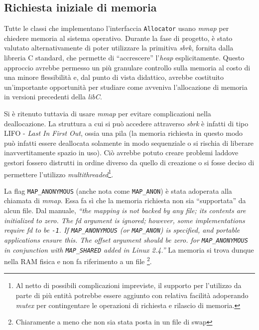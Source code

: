 \subsection{Richiesta iniziale di memoria}
Tutte le classi che implementano l’interfaccia \texttt{Allocator} usano \textit{mmap} per chiedere memoria al sistema operativo. Durante la fase di progetto, è stato valutato alternativamente di poter utilizzare la primitiva \textit{sbrk}, fornita dalla libreria C standard, che permette di “accrescere” l’\textit{heap} esplicitamente. Questo approccio avrebbe permesso un più granulare controllo sulla memoria al costo di una minore flessibilità e, dal punto di vista didattico, avrebbe costituito un'importante opportunità per studiare come avveniva l’allocazione di memoria in versioni precedenti della \textit{libC}.

Si è ritenuto tuttavia di usare \textit{mmap} per evitare complicazioni nella deallocazione. La struttura a cui si può accedere attraverso \textit{sbrk} è infatti di tipo LIFO - \textit{Last In First Out}, ossia una pila (la memoria richiesta in questo modo può infatti essere deallocata solamente in modo sequenziale o si rischia di liberare inavvertitamente spazio in uso). Ciò avrebbe potuto creare problemi laddove gestori fossero distrutti in ordine diverso da quello di creazione o si fosse deciso di permettere l’utilizzo \textit{multithreaded}\footnote{Al netto di possibili complicazioni impreviste, il supporto per l'utilizzo da parte di più entità potrebbe essere aggiunto con relativa facilità adoperando \textit{mutex} per contingentare le operazioni di richiesta e rilascio di memoria.}.

La flag \texttt{MAP\_ANONYMOUS} (anche nota come \texttt{MAP\_ANON}) è stata adoperata alla chiamata di \textit{mmap}. Essa fa sì che la memoria richiesta non sia “supportata” da alcun file. Dal manuale, \textit{“the mapping is not backed by any file; its contents are initialized to zero. The fd argument is ignored; however, some implementations require fd to be \texttt{-1}. If \texttt{MAP\_ANONYMOUS} (or \texttt{MAP\_ANON}) is specified, and portable applications ensure this. The offset argument should be zero. for \texttt{MAP\_ANONYMOUS} in conjunction with \texttt{MAP\_SHARED} added in Linux 2.4.”} La memoria si trova dunque nella RAM fisica e non fa riferimento a un file \footnote{Chiaramente a meno che non sia stata posta in un file di swap}.

